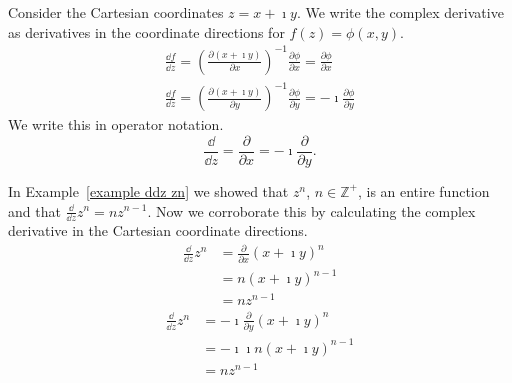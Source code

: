 \begin{Example}
  \label{complex_deriv_cart}
  Consider the Cartesian coordinates $z = x + \imath y$. 
  We write the complex derivative as derivatives in the 
  coordinate directions for $f(z) = \phi(x,y)$.
  \begin{gather*}
    \frac{\dd f}{\dd z} = \left( \frac{\partial (x + \imath y)}{\partial x} \right)^{-1} 
    \frac{\partial \phi}{\partial x}
    = \frac{\partial \phi}{\partial x}
    \\
    \frac{\dd f}{\dd z} = \left( \frac{\partial (x + \imath y)}{\partial y} \right)^{-1} 
    \frac{\partial \phi}{\partial y}
    = - \imath \frac{\partial \phi}{\partial y}
  \end{gather*}
  We write this in operator notation.
  \[
  \frac{\dd}{\dd z} = \frac{\partial}{\partial x} = -\imath \frac{\partial}{\partial y}.
  \]
\end{Example}






\begin{Example}
  In Example~\ref{example ddz zn}
  we showed that $z^n$, $n \in \mathbb{Z}^+$, is an entire function and that
  $\frac{\dd}{\dd z} z^n = n z^{n-1}$.  Now we corroborate this by calculating 
  the complex derivative in the Cartesian coordinate directions.
  \begin{align*}
    \frac{\dd}{\dd z} z^n
    &= \frac{\partial}{\partial x} (x + \imath y)^n 
    \\
    &= n (x + \imath y)^{n-1} 
    \\
    &= n z^{n-1}
  \end{align*}
  \begin{align*}
    \frac{\dd}{\dd z} z^n
    &= -\imath \frac{\partial}{\partial y} (x + \imath y)^n 
    \\
    &= -\imath \imath n (x + \imath y)^{n-1} 
    \\
    &= n z^{n-1}
  \end{align*}
\end{Example}














